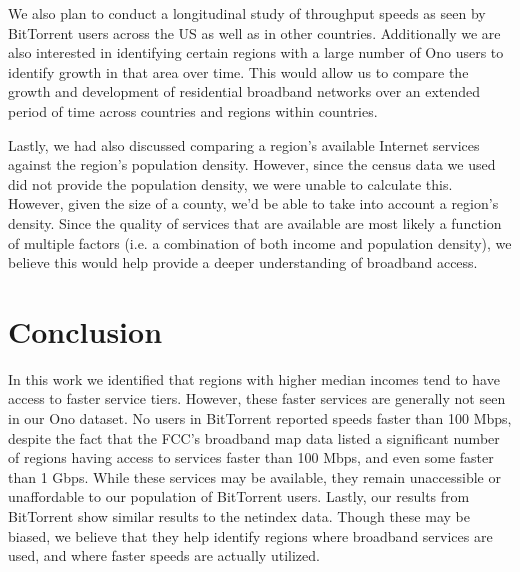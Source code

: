 \documentclass{sig-alternate-10pt}
\begin{document}
We also plan to conduct a longitudinal study of throughput speeds as seen by
BitTorrent users across the US as well as in other countries.  Additionally we
are also interested in identifying certain regions with a large number of Ono
users to identify growth in that area over time.  This would allow us to 
compare the growth and development of residential broadband networks over
an extended period of time across countries and regions within countries.

Lastly, we had also discussed comparing a region's available Internet services
against the region's population density.  However, since the census data we
used did not provide the population density, we were unable to calculate this.
However, given the size of a county, we'd be able to take into account a
region's density.  Since the quality of services that are available are most
likely a function of multiple factors (i.e. a combination of both income and
population density), we believe this would help provide a deeper understanding
of broadband access.

\section{Conclusion}
\label{sec:conclusion} 

In this work we identified that regions with higher median incomes tend to have
access to faster service tiers.  However, these faster services are generally
not seen in our Ono dataset.  No users in BitTorrent reported speeds faster
than 100 Mbps, despite the fact that the FCC's broadband map data listed a
significant number of regions having access to services faster than 100 Mbps,
and even some faster than 1 Gbps.  While these services may be available, they
remain unaccessible or unaffordable to our population of BitTorrent users.
Lastly, our results from BitTorrent show similar results to the netindex data.
Though these may be biased, we believe that they help identify regions where
broadband services are used, and where faster speeds are actually utilized.
\end{document}
